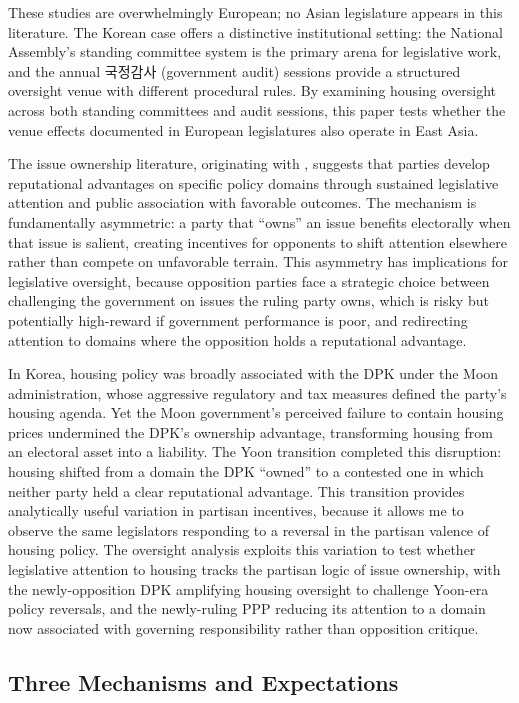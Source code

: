 \documentclass[11pt]{article}
\begin{document}
These studies are overwhelmingly European; no Asian legislature appears in this literature. The Korean case offers a distinctive institutional setting: the National Assembly's standing committee system is the primary arena for legislative work, and the annual 국정감사 (government audit) sessions provide a structured oversight venue with different procedural rules. By examining housing oversight across both standing committees and audit sessions, this paper tests whether the venue effects documented in European legislatures also operate in East Asia.

The issue ownership literature, originating with \citet{petrocik1996}, suggests that parties develop reputational advantages on specific policy domains through sustained legislative attention and public association with favorable outcomes. The mechanism is fundamentally asymmetric: a party that ``owns'' an issue benefits electorally when that issue is salient, creating incentives for opponents to shift attention elsewhere rather than compete on unfavorable terrain. This asymmetry has implications for legislative oversight, because opposition parties face a strategic choice between challenging the government on issues the ruling party owns, which is risky but potentially high-reward if government performance is poor, and redirecting attention to domains where the opposition holds a reputational advantage.

In Korea, housing policy was broadly associated with the DPK under the Moon administration, whose aggressive regulatory and tax measures defined the party's housing agenda. Yet the Moon government's perceived failure to contain housing prices undermined the DPK's ownership advantage, transforming housing from an electoral asset into a liability. The Yoon transition completed this disruption: housing shifted from a domain the DPK ``owned'' to a contested one in which neither party held a clear reputational advantage. This transition provides analytically useful variation in partisan incentives, because it allows me to observe the same legislators responding to a reversal in the partisan valence of housing policy. The oversight analysis exploits this variation to test whether legislative attention to housing tracks the partisan logic of issue ownership, with the newly-opposition DPK amplifying housing oversight to challenge Yoon-era policy reversals, and the newly-ruling PPP reducing its attention to a domain now associated with governing responsibility rather than opposition critique.

\subsection{Three Mechanisms and Expectations}
\end{document}
